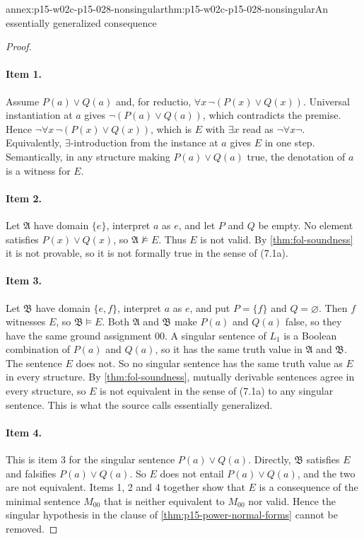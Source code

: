\begin{annexitem}{annex:p15-w02c-p15-028-nonsingular}{thm:p15-w02c-p15-028-nonsingular}{An essentially generalized consequence}
\begin{proof}
\paragraph{Item 1.}
Assume \(P(a)\lor Q(a)\) and, for reductio,
\(\forall x\,\neg(P(x)\lor Q(x))\). Universal instantiation at \(a\)
gives \(\neg(P(a)\lor Q(a))\), which contradicts the premise. Hence
\(\neg\forall x\,\neg(P(x)\lor Q(x))\), which is \(E\) with
\(\exists x\) read as \(\neg\forall x\neg\). Equivalently,
\(\exists\)-introduction from the instance at \(a\) gives \(E\) in one
step. Semantically, in any structure making \(P(a)\lor Q(a)\) true, the
denotation of \(a\) is a witness for \(E\).

\paragraph{Item 2.}
Let \(\mathfrak A\) have domain \(\{e\}\), interpret \(a\) as \(e\), and
let \(P\) and \(Q\) be empty. No element satisfies \(P(x)\lor Q(x)\),
so \(\mathfrak A\not\models E\). Thus \(E\) is not valid. By
\cref{thm:fol-soundness} it is not provable, so it is not
formally true in the sense of (7.1a).

\paragraph{Item 3.}
Let \(\mathfrak B\) have domain \(\{e,f\}\), interpret \(a\) as \(e\),
and put \(P=\{f\}\) and \(Q=\varnothing\). Then \(f\) witnesses
\(E\), so \(\mathfrak B\models E\). Both \(\mathfrak A\) and
\(\mathfrak B\) make \(P(a)\) and \(Q(a)\) false, so they have the same
ground assignment \(00\). A singular sentence of \(L_1\) is a Boolean
combination of \(P(a)\) and \(Q(a)\), so it has the same truth value in
\(\mathfrak A\) and \(\mathfrak B\). The sentence \(E\) does not. So no
singular sentence has the same truth value as \(E\) in every
structure. By \cref{thm:fol-soundness}, mutually derivable
sentences agree in every structure, so \(E\) is not equivalent in the
sense of (7.1a) to any singular sentence. This is what the source calls
essentially generalized.

\paragraph{Item 4.}
This is item 3 for the singular sentence \(P(a)\lor Q(a)\). Directly,
\(\mathfrak B\) satisfies \(E\) and falsifies \(P(a)\lor Q(a)\). So
\(E\) does not entail \(P(a)\lor Q(a)\), and the two are not
equivalent. Items 1, 2 and 4 together show that \(E\) is a consequence
of the minimal sentence \(M_{00}\) that is neither equivalent to
\(M_{00}\) nor valid. Hence the singular hypothesis in the clause of
\cref{thm:p15-power-normal-forms} cannot be removed.


\end{proof}
\end{annexitem}
